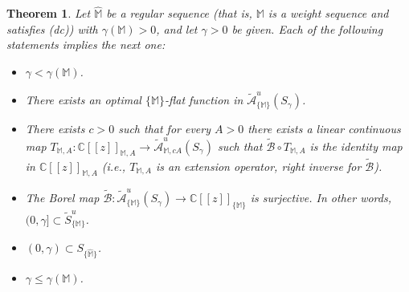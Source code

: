 \documentclass[11pt,a4paper]{article}
\theoremstyle{plain}
\newtheorem{theo}{Theorem}[section]
\theoremstyle{definition}
\newcommand{\C}{\mathbb{C}}
\newcommand{\M}{\mathbb{M}}
\newcommand{\hM}{\widehat{\M}}
\def\ga{\gamma}
\begin{document}
\begin{theo}\label{tpral}
Let $\hM$ be a regular sequence (that is, $\M$ is a weight sequence and satisfies (dc))
with $\ga(\M)>0$, and let $\ga>0$ be given. Each of the following statements implies the next one:
\begin{itemize}
\item[(i)] $\ga<\ga(\M)$.
\item[(ii)] There exists an optimal $\{\M\}$-flat function in $\widetilde{\mathcal{A}}^u_{\{\M\}}(S_{\ga})$.
\item[(iii)] There exists $c>0$ such that for every $A>0$ there exists a linear continuous map $T_{\M,A}\colon\C[[z]]_{\M,A}\to \widetilde{\mathcal{A}}^u_{\M,cA}(S_{\ga})$ such that $\widetilde{\mathcal{B}}\circ T_{\M,A}$ is the identity map in $\C[[z]]_{\M,A}$ (i.e., $T_{\M,A}$ is an extension operator,  right inverse for $\widetilde{\mathcal{B}}$).
\item[(iv)] The Borel map $\widetilde{\mathcal{B}}\colon \widetilde{\mathcal{A}}^u_{\{\M\}}(S_{\ga})\to\C[[z]]_{\{\M\}}$ is surjective. In other words, $(0,\ga]\subset\widetilde{S}_{\{\M\}}^u$.
\item[(v)] $(0,\ga)\subset S_{\{\hM\}}$.
\item[(vi)] $\ga\le\ga(\M)$.
\end{itemize}
\end{theo}
\end{document}
